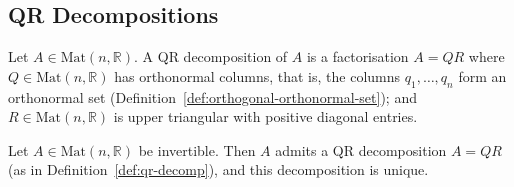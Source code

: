 	\subsection{QR Decompositions}
		
		\begin{definition}[QR Decomposition]
			\label{def:qr-decomp}
			Let $A \in \mathrm{Mat}(n, \mathbb{R})$. A QR decomposition of $A$ is a factorisation $A=QR$ where $Q \in \mathrm{Mat}(n,\mathbb{R})$ has orthonormal columns, that is, the columns $q_1, \dots, q_n$ form an orthonormal set (Definition~\ref{def:orthogonal-orthonormal-set}); and $R \in \mathrm{Mat}(n,\mathbb{R})$ is upper triangular with positive diagonal entries.
		\end{definition}
		
		\begin{theorem}
			\label{thm:existence-qr-decomp}
			Let $A \in \mathrm{Mat}(n,\mathbb{R})$ be invertible. Then $A$ admits a QR decomposition $A=QR$ (as in Definition~\ref{def:qr-decomp}), and this decomposition is unique.
		\end{theorem}
		
